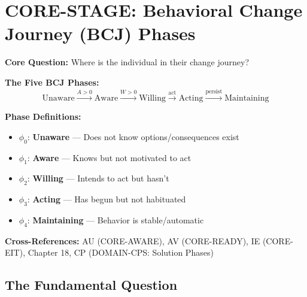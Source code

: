 \chapter{CORE-STAGE: Behavioral Change Journey (BCJ) Phases}
\label{app:core-stage}

\begin{abstract}
This appendix answers the eighth fundamental question:
\textit{``Where is the individual in their behavioral change journey?''}
We formalize the five-phase BCJ model: (1) Unaware, (2) Aware, (3) Willing,
(4) Acting, (5) Maintaining. Each phase has characteristic barriers and
appropriate intervention types. Stage-mismatched interventions fail.
\end{abstract}

\begin{tcolorbox}[colback=blue!5!white, colframe=blue!75!black,
    title=Quick Reference: CORE-STAGE]

\textbf{Core Question:} Where is the individual in their change journey?

\textbf{The Five BCJ Phases:}
\begin{equation}
\text{Unaware} \xrightarrow{A>0} \text{Aware} \xrightarrow{W>0} \text{Willing} \xrightarrow{\text{act}} \text{Acting} \xrightarrow{\text{persist}} \text{Maintaining}
\end{equation}

\textbf{Phase Definitions:}
\begin{itemize}[nosep]
\item $\phi_0$: \textbf{Unaware} --- Does not know options/consequences exist
\item $\phi_1$: \textbf{Aware} --- Knows but not motivated to act
\item $\phi_2$: \textbf{Willing} --- Intends to act but hasn't
\item $\phi_3$: \textbf{Acting} --- Has begun but not habituated
\item $\phi_4$: \textbf{Maintaining} --- Behavior is stable/automatic
\end{itemize}

\textbf{Cross-References:}
AU (CORE-AWARE), AV (CORE-READY), IE (CORE-EIT), Chapter 18, CP (DOMAIN-CPS: Solution Phases)

\end{tcolorbox}

\section{The Fundamental Question}
\label{sec:stage-fundamental}

